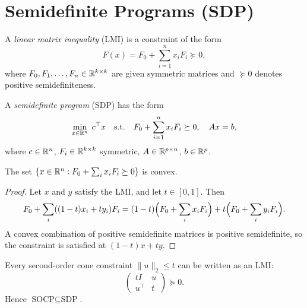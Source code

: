 \documentclass[11pt,a4paper]{article}
\begin{document}

\section{Semidefinite Programs (SDP)}\label{sec:sdp}

\begin{definition}\label{def:lmi}
A \emph{linear matrix inequality} (LMI) is a constraint of the form
\begin{equation}\label{eq:lmi}
  F(x) = F_0 + \sum_{i=1}^n x_i F_i \succeq 0,
\end{equation}
where $F_0, F_1, \dots, F_n \in \mathbb{R}^{k \times k}$ are given symmetric matrices
and $\succeq 0$ denotes positive semidefiniteness.
\end{definition}

\begin{definition}\label{def:sdp}
A \emph{semidefinite program} (SDP) has the form
\begin{equation}\label{eq:sdp}
  \min_{x \in \mathbb{R}^n} \; c^\top x \quad
  \text{s.t.} \quad F_0 + \sum_{i=1}^n x_i F_i \succeq 0, \quad
  Ax = b,
\end{equation}
where $c \in \mathbb{R}^n$, $F_i \in \mathbb{R}^{k \times k}$ symmetric, $A \in \mathbb{R}^{p \times n}$,
$b \in \mathbb{R}^p$.
\end{definition}

\begin{proposition}\label{prop:lmi-convex}
The set $\{x \in \mathbb{R}^n : F_0 + \sum_i x_i F_i \succeq 0\}$ is convex.
\end{proposition}

\begin{proof}
Let $x$ and $y$ satisfy the LMI, and let $t \in [0,1]$. Then
\[
  F_0 + \sum_i ((1-t)x_i + t y_i) F_i
  = (1-t)\Bigl(F_0 + \sum_i x_i F_i\Bigr) + t\Bigl(F_0 + \sum_i y_i F_i\Bigr).
\]
A convex combination of positive semidefinite matrices is positive semidefinite,
so the constraint is satisfied at $(1-t)x + ty$.
\end{proof}

\begin{proposition}\label{prop:socp-in-sdp}
Every second-order cone constraint $\|u\|_2 \le t$ can be written as an LMI:
\begin{equation}\label{eq:soc-as-lmi}
  \begin{pmatrix} t I & u \\ u^\top & t \end{pmatrix} \succeq 0.
\end{equation}
Hence $\text{SOCP} \subseteq \text{SDP}$.
\end{proposition}
\end{document}
